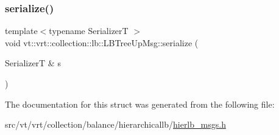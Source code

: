 \subsubsection{\texorpdfstring{serialize()}{serialize()}}
{\footnotesize\ttfamily template$<$typename SerializerT $>$ \\
void vt\+::vrt\+::collection\+::lb\+::\+L\+B\+Tree\+Up\+Msg\+::serialize (\begin{DoxyParamCaption}\item[{SerializerT \&}]{s }\end{DoxyParamCaption})\hspace{0.3cm}{\ttfamily [inline]}}



The documentation for this struct was generated from the following file\+:\begin{DoxyCompactItemize}
\item 
src/vt/vrt/collection/balance/hierarchicallb/\hyperlink{hierlb__msgs_8h}{hierlb\+\_\+msgs.\+h}\end{DoxyCompactItemize}
